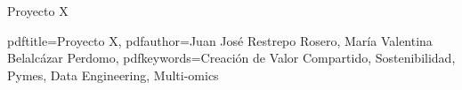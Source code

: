 

\titulo
{Proyecto X}


\fecha{\today}

\hypersetup
{
  pdftitle={Proyecto X},
  pdfauthor={Juan José Restrepo Rosero, María Valentina Belalcázar Perdomo},
  pdfkeywords={Creación de Valor Compartido, Sostenibilidad, Pymes, Data Engineering, Multi-omics}
}




